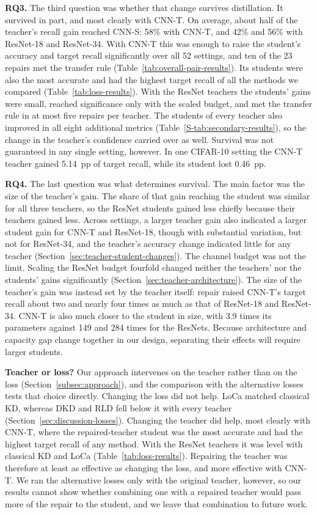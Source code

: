\documentclass[10pt,journal,compsoc]{IEEEtran}
\theoremstyle{definition}
\begin{document}
\textbf{RQ3.} The third question was whether that change survives
distillation. It survived in part, and most clearly with CNN-T. On
average, about half of the teacher's recall gain reached CNN-S: 58\%
with CNN-T, and 42\% and 56\% with ResNet-18 and ResNet-34. With CNN-T
this was enough to raise the student's accuracy and target recall
significantly over all 52 settings, and ten of the 23 repairs met the
transfer rule (Table~\ref{tab:overall-pair-results}). Its students were
also the most accurate and had the highest target recall of all the
methods we compared (Table~\ref{tab:loss-results}). With the ResNet
teachers the students' gains were small, reached significance only with
the scaled budget, and met the transfer rule in at most five repairs
per teacher. The students of every teacher also improved in all eight
additional metrics (Table~\ref{S-tab:secondary-results}), so the change
in the teacher's confidence carried over as well. Survival was not
guaranteed in any single setting, however. In one CIFAR-10 setting the
CNN-T teacher gained 5.14~pp of target recall, while its student lost
0.46~pp.

\textbf{RQ4.} The last question was what determines survival. The main
factor was the size of the teacher's gain. The share of that gain
reaching the student was similar for all three teachers, so the ResNet
students gained less chiefly because their teachers gained less. Across
settings, a larger teacher gain also indicated a larger student gain
for CNN-T and ResNet-18, though with substantial variation, but not for
ResNet-34, and the teacher's accuracy change indicated little for any
teacher (Section~\ref{sec:teacher-student-changes}). The channel budget
was not the limit. Scaling the ResNet budget fourfold changed neither
the teachers' nor the students' gains significantly
(Section~\ref{sec:teacher-architecture}). The size of the teacher's
gain was instead set by the teacher itself: repair raised CNN-T's target
recall about two and nearly four times as much as that of ResNet-18 and
ResNet-34. CNN-T is also much closer to the student in size, with 3.9
times its parameters against 149 and 284 times for the ResNets. Because
architecture and capacity gap change together in our design, separating
their effects will require larger students.

\textbf{Teacher or loss?} Our approach intervenes on the teacher rather
than on the loss (Section~\ref{subsec:approach}), and the comparison
with the alternative losses tests that choice directly. Changing the
loss did not help. LoCa matched classical KD, whereas DKD and RLD fell
below it with every teacher (Section~\ref{sec:discussion-losses}).
Changing the teacher did help, most clearly with CNN-T, where the
repaired-teacher student was the most accurate and had the highest
target recall of any method. With the ResNet teachers it was level with
classical KD and LoCa (Table~\ref{tab:loss-results}). Repairing the
teacher was therefore at least as effective as changing the loss, and
more effective with CNN-T. We ran the alternative losses only with the
original teacher, however, so our results cannot show whether combining
one with a repaired teacher would pass more of the repair to the
student, and we leave that combination to future work.
\end{document}
